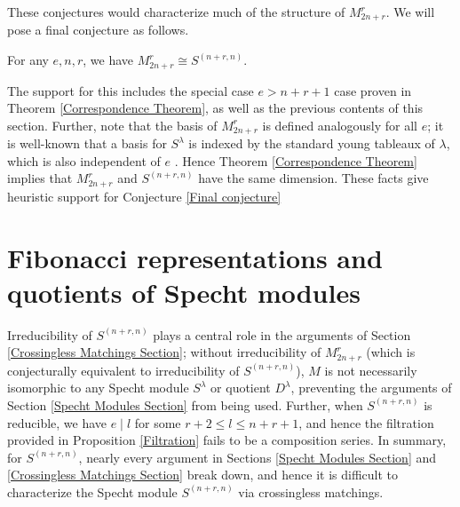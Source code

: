\documentclass{amsart}
\begin{document}
 These conjectures would characterize much of the structure of $M_{2n + r}^r$.
 We will pose a final conjecture as follows.
 \begin{conjecture}\label{Final conjecture}
 	For any $e,n,r$, we have $M_{2n + r}^r \cong S^{(n+r,n)}$.
 \end{conjecture}
 The support for this includes the special case $e > n+r+1$ case proven in Theorem \ref{Correspondence Theorem}, as well as the previous contents of this section.
 Further, note that the basis of $M_{2n + r}^r$ is defined analogously for all $e$;
 it is well-known that a basis for $S^\lambda$ is indexed by the standard young tableaux of $\lambda$, which is also independent of $e$ \cite[Prop.~3.22]{Mathas-book}.
 Hence Theorem \ref{Correspondence Theorem} implies that $M_{2n + r}^r$ and $S^{(n+r,n)}$ have the same dimension. 
  These facts give heuristic support for Conjecture \ref{Final conjecture}
 
\section{Fibonacci representations and quotients of Specht modules}\label{Fibonacci Section}
Irreducibility of $S^{(n+r,n)}$ plays a central role in the arguments of Section \ref{Crossingless Matchings Section};
without irreducibility of $M_{2n + r}^r$ (which is conjecturally equivalent to irreducibility of $S^{(n+r,n)}$), $M$ is not necessarily isomorphic to any Specht module $S^\lambda$ or quotient $D^\lambda$, preventing the arguments of Section \ref{Specht Modules Section} from being used.
Further, when $S^{(n+r,n)}$ is reducible, we have $e \mid l$ for some $r+2 \leq l \leq n+r+1$, and hence the filtration provided in Proposition \ref{Filtration} fails to be a composition series.
In summary, for $S^{(n+r,n)}$, nearly every argument in Sections \ref{Specht Modules Section} and \ref{Crossingless Matchings Section} break down, and hence it is difficult to characterize the Specht module $S^{(n+r,n)}$ via crossingless matchings.
\end{document}
